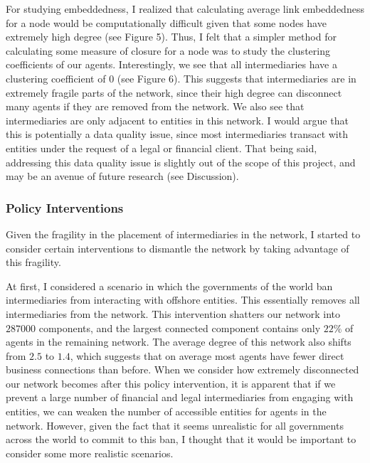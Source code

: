 \documentclass[11pt]{article}
\begin{document}
For studying embeddedness, I realized that calculating average link embeddedness
for a node would be computationally difficult given that some nodes have
extremely high degree (see Figure 5). Thus, I felt that a simpler method for
calculating some measure of closure for a node was to study the clustering
coefficients of our agents. Interestingly, we see that all intermediaries have
a clustering coefficient of $0$ (see Figure 6). This suggests that
intermediaries are in extremely fragile parts of the network, since their
high degree can disconnect many agents if they are removed from the network. We
also see that intermediaries are only adjacent to entities in this network. I
would argue that this is potentially a data quality issue, since most
intermediaries transact with entities under the request of a legal or financial
client. That being said, addressing this data quality
issue is slightly out of the scope of this project, and may be an avenue of
future research (see Discussion).

\subsubsection{Policy Interventions}

Given the fragility in the placement of intermediaries in the
network, I started to consider certain interventions to dismantle the network 
by taking advantage of this fragility.

At first, I considered a scenario in which the governments of the world ban
intermediaries from interacting with offshore entities. This essentially removes
all intermediaries from the network. This intervention shatters our network into
$287000$ components, and the largest connected component contains only $22\%$
of agents in the remaining network. The average degree of this network also
shifts from $2.5$ to $1.4$, which suggests that on average most agents have
fewer direct business connections than before. When we consider how extremely
disconnected our network becomes after this policy intervention, it is
apparent that if we prevent a large number of financial and legal intermediaries
from engaging with entities, we can weaken the number of accessible
entities for agents in the network. However, given the fact that it seems 
unrealistic
for all governments across the world to commit to this ban, I thought
that it would be important to consider some more realistic scenarios.
\end{document}
